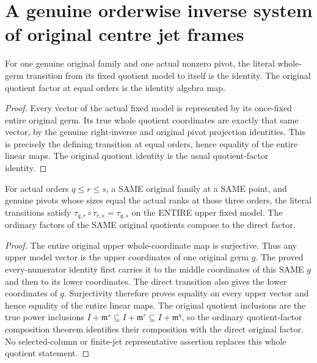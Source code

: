 \section{A genuine orderwise inverse system of original centre jet frames}

\begin{theorem}
\label{hir:actual-centre-jet-frame-truncation-identity}
For one genuine original family and one actual nonzero pivot, the
literal whole-germ transition from its fixed quotient model to itself
is the identity. The original quotient factor at equal orders is the
identity algebra map.
\leanok
\end{theorem}
\begin{proof}
Every vector of the actual fixed model is represented by its once-fixed
entire original germ. Its true whole quotient coordinates are exactly
that same vector, by the genuine right-inverse and original pivot
projection identities. This is precisely the defining transition at
equal orders, hence equality of the entire linear maps. The original
quotient identity is the usual quotient-factor identity.
\end{proof}

\begin{theorem}
\label{hir:actual-centre-jet-frame-truncation-cocycle}
For actual orders $q\le r\le s$, a SAME original family at a SAME point,
and genuine pivots whose sizes equal the actual ranks at those three
orders, the literal transitions satisfy
$\tau_{q,r}\circ\tau_{r,s}=\tau_{q,s}$ on the ENTIRE upper fixed model.
The ordinary factors of the SAME original quotients compose to the
direct factor.
\leanok
\end{theorem}
\begin{proof}
The entire original upper whole-coordinate map is surjective. Thus
any upper model vector is the upper coordinates of one original germ
$g$. The proved every-numerator identity first carries it to the middle
coordinates of this SAME $g$ and then to its lower coordinates. The
direct transition also gives the lower coordinates of $g$. Surjectivity
therefore proves equality on every upper vector and hence equality of
the entire linear maps. The original quotient inclusions are the true
power inclusions $I+\mathfrak m^s\subseteq I+\mathfrak m^r\subseteq
I+\mathfrak m^q$, so the ordinary quotient-factor composition theorem
identifies their composition with the direct original factor. No
selected-column or finite-jet representative assertion replaces this
whole quotient statement.
\end{proof}

